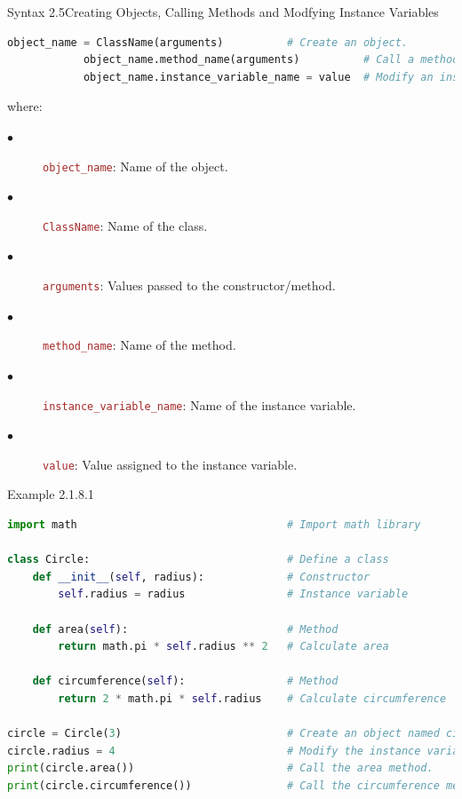 \documentclass{book}
\begin{document}
    \begin{synBox}{Syntax 2.5}{Creating Objects, Calling Methods and Modfying Instance Variables}
        \begin{lstlisting}[language=Python, basicstyle=\ttfamily\small, keywordstyle=\color{blue}, commentstyle=\color{forestgreen}, stringstyle=\color{red}, showstringspaces=false]   
            object_name = ClassName(arguments)          # Create an object.          
            object_name.method_name(arguments)          # Call a method.          
            object_name.instance_variable_name = value  # Modify an instance variable.
        \end{lstlisting}
    \raggedright
    where: \\
    \begin{description}
        \item[$\bullet$] \texttt{\textcolor{brown}{object\_name}}: Name of the object.
        \item[$\bullet$] \texttt{\textcolor{brown}{ClassName}}: Name of the class.
        \item[$\bullet$] \texttt{\textcolor{brown}{arguments}}: Values passed to the constructor/method.
        \item[$\bullet$] \texttt{\textcolor{brown}{method\_name}}: Name of the method.
        \item[$\bullet$] \texttt{\textcolor{brown}{instance\_variable\_name}}: Name of the instance variable.
        \item[$\bullet$] \texttt{\textcolor{brown}{value}}: Value assigned to the instance variable.
    \end{description}
    \end{synBox}
    \newpage
    \begin{egBox}[]{Example 2.1.8.1}{}
    \begin{lstlisting}[language=Python, basicstyle=\ttfamily\small, keywordstyle=\color{blue}, commentstyle=\color{forestgreen}, stringstyle=\color{red}, showstringspaces=false]
import math                                 # Import math library

class Circle:                               # Define a class
    def __init__(self, radius):             # Constructor
        self.radius = radius                # Instance variable

    def area(self):                         # Method
        return math.pi * self.radius ** 2   # Calculate area

    def circumference(self):                # Method
        return 2 * math.pi * self.radius    # Calculate circumference

circle = Circle(3)                          # Create an object named circle with radius 3.
circle.radius = 4                           # Modify the instance variable radius to 4.
print(circle.area())                        # Call the area method.
print(circle.circumference())               # Call the circumference method.
    \end{lstlisting}
    \end{egBox}
\end{document}
